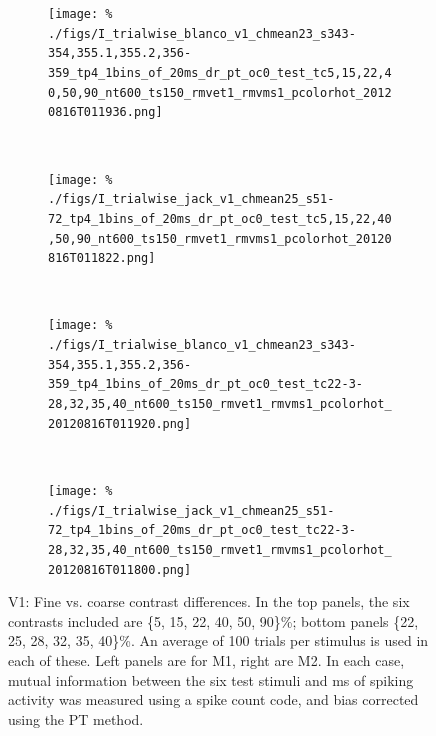 \begin{figure}[htbp]
    \begin{subfigure}[b]{0.5\linewidth}
        \centering
        \caption{}
        \label{fig:b1-1x20cc}
        \texttt{[image: \%
./figs/I\_trialwise\_blanco\_v1\_chmean23\_s343-354,355.1,355.2,356-359\_tp4\_1bins\_of\_20ms\_dr\_pt\_oc0\_test\_tc5,15,22,40,50,90\_nt600\_ts150\_rmvet1\_rmvms1\_pcolorhot\_20120816T011936.png]}
    \end{subfigure}
    ~~
    \begin{subfigure}[b]{0.5\linewidth}
        \centering
        \caption{}
        \label{fig:j1-1x20cc}
        \texttt{[image: \%
./figs/I\_trialwise\_jack\_v1\_chmean25\_s51-72\_tp4\_1bins\_of\_20ms\_dr\_pt\_oc0\_test\_tc5,15,22,40,50,90\_nt600\_ts150\_rmvet1\_rmvms1\_pcolorhot\_20120816T011822.png]}
    \end{subfigure}
    \\
    \begin{subfigure}[b]{0.5\linewidth}
        \centering
        \caption{}
        \label{fig:b1-1x20fc}
        \texttt{[image: \%
./figs/I\_trialwise\_blanco\_v1\_chmean23\_s343-354,355.1,355.2,356-359\_tp4\_1bins\_of\_20ms\_dr\_pt\_oc0\_test\_tc22-3-28,32,35,40\_nt600\_ts150\_rmvet1\_rmvms1\_pcolorhot\_20120816T011920.png]}
    \end{subfigure}
    ~~
    \begin{subfigure}[b]{0.5\linewidth}
        \centering
        \caption{}
        \label{fig:j1-1x20fc}
        \texttt{[image: \%
./figs/I\_trialwise\_jack\_v1\_chmean25\_s51-72\_tp4\_1bins\_of\_20ms\_dr\_pt\_oc0\_test\_tc22-3-28,32,35,40\_nt600\_ts150\_rmvet1\_rmvms1\_pcolorhot\_20120816T011800.png]}
    \end{subfigure}
    \caption{V1: Fine vs. coarse contrast differences.
In the top panels, the six contrasts included are \{5, 15, 22, 40, 50, 90\}\%; bottom panels \{22, 25, 28, 32, 35, 40\}\%. An average of 100 trials per stimulus is used in each of these.
Left panels are for M1, right are M2.
In each case, mutual information between the six test stimuli and \unit[20]{ms} of spiking activity was measured using a spike count code, and bias corrected using the PT method.
}
    \label{fig:v1-fvc}
\end{figure}


